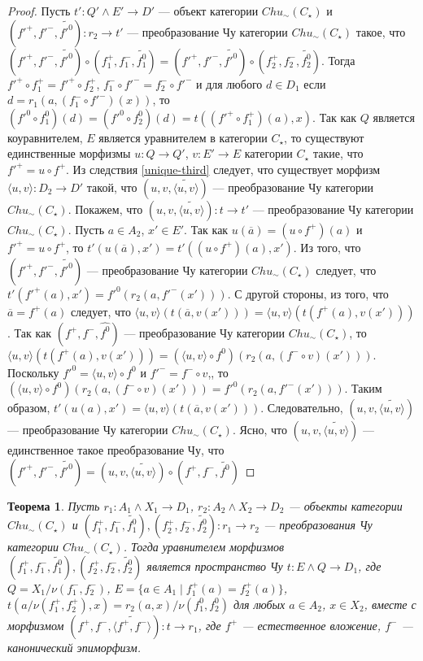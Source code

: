 \documentclass[a4paper,12pt]{article}
\newtheorem{theorem}{Теорема}
\begin{document}
\begin{proof}
    Пусть $t': Q' \wedge E' \to D'$ --- объект категории $Chu_\sim(C_\star)$ и $(f'^+,f'^-,\widetilde{f'^0}): r_2 \to t'$ --- преобразование Чу категории $Chu_\sim(C_\star)$ такое, что $(f'^+,f'^-,\widetilde{f'^0}) \circ (f_1^+,f_1^-,\widetilde{f_1^0}) = (f'^+,f'^-,\widetilde{f'^0}) \circ (f_2^+,f_2^-,\widetilde{f_2^0})$. Тогда $f'^+ \circ f_1^+ = f'^+ \circ f_2^+$, $f_1^- \circ f'^- = f_2^- \circ f'^-$ и для любого $d \in D_1$ если $d = r_1(a,(f_1^- \circ f'^-)(x))$, то $(f'^0 \circ f_1^0)(d) = (f'^0 \circ f_2^0)(d) = t((f'^+ \circ f_1^+)(a),x)$. Так как $Q$ является коуравнителем, $E$ является уравнителем в категории $C_\star$, то существуют единственные морфизмы $u: Q \to Q'$, $v: E' \to E$ категории $C_\star$ такие, что $f'^+ = u \circ f^+$. Из следствия \ref{unique-third} следует, что существует морфизм $\langle u,v \rangle : D_2 \to D'$ такой, что $(u,v,\widetilde{\langle u,v \rangle})$ --- преобразование Чу категории $Chu_\sim(C_\star)$. Покажем, что $(u,v,\widetilde{\langle u,v \rangle}): t \to t'$ --- преобразование Чу категории $Chu_\sim(C_\star)$. Пусть $a \in A_2$, $x' \in E'$. Так как $u(\overline{a}) = (u \circ f^+)(a)$ и $f'^+ = u \circ f^+$, то $t'(u(\overline{a}),x') = t'((u \circ f^+)(a),x')$. Из того, что $(f'^+,f'^-,\widetilde{f'^0})$ --- преобразование Чу категории $Chu_\sim(C_\star)$ следует, что $t'(f'^+(a),x') = f'^0(r_2(a,f'^-(x')))$. С другой стороны, из того, что $\overline{a} = f^+(a)$ следует, что $\langle u,v \rangle(t(\overline{a},v(x'))) = \langle u,v \rangle(t(f^+(a),v(x')))$. Так как $(f^+,f^-,\widehat{f^0})$ --- преобразование Чу категории $Chu_\sim(C_\star)$, то $\langle u,v \rangle(t(f^+(a),v(x'))) = (\langle u,v \rangle \circ f^0)(r_2(a,(f^- \circ v)(x')))$. Поскольку $f'^0 = \langle u,v \rangle \circ f^0$ и $f'^- = f^- \circ v$,, то $(\langle u,v \rangle \circ f^0)(r_2(a,(f^- \circ v)(x'))) = f'^0(r_2(a,f'^-(x')))$. Таким образом, $t'(u(a),x') = \langle u,v \rangle(t(\overline{a},v(x')))$. Следовательно, $(u,v,\widetilde{\langle u,v \rangle})$ --- преобразование Чу категории $Chu_\sim(C_\star)$. Ясно, что $(u,v,\widetilde{\langle u,v \rangle})$ --- единственное такое преобразование Чу, что $(f'^+,f'^-,\widetilde{f'^0}) = (u,v,\widetilde{\langle u,v \rangle}) \circ (f^+,f^-,\widetilde{f^0})$ 
\end{proof}

\begin{theorem}
    Пусть $r_1: A_1 \wedge X_1 \to D_1$, $r_2: A_2 \wedge X_2 \to D_2$ --- объекты категории $Chu_\sim(C_\star)$ и $(f_1^+,f_1^-,\widetilde{f_1^0}), (f_2^+,f_2^-,\widetilde{f_2^0}): r_1 \to r_2$ --- преобразования Чу категории $Chu_\sim(C_\star)$. Тогда уравнителем морфизмов $(f_1^+,f_1^-,\widetilde{f_1^0}), (f_2^+,f_2^-,\widetilde{f_2^0})$ является пространство Чу $t: E \wedge Q \to D_1$, где $Q = X_1/\nu(f_1^-,f_2^-)$, $E = \{a \in A_1 \mid f_1^+(a) = f_2^+(a)\}$, $t(a/\nu(f_1^+,f_2^+),x) = r_2(a,x)/\nu(f_1^0,f_2^0)$ для любых $a \in A_2$, $x \in X_2$, вместе с морфизмом $(f^+,f^-,\widetilde{\langle f^+,f^- \rangle}): t \to r_1$, где $f^+$ --- естественное вложение, $f^-$ --- канонический эпиморфизм. 
\end{theorem}
\end{document}
